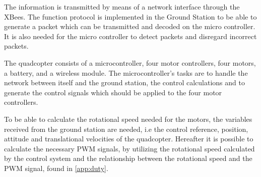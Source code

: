 The information is transmitted by means of a network interface through the XBees. The function protocol is implemented in the Ground Station to be able to generate a packet which can be transmitted and decoded on the micro controller. It is also needed for the micro controller to detect packets and disregard incorrect packets.

The quadcopter consists of a microcontroller, four motor controllers, four motors, a battery, and a wireless module. The microcontroller's tasks are to handle the network between itself and the ground station, the control calculations and to generate the control signals which should be applied to the four motor controllers.

To be able to calculate the rotational speed needed for the motors, the variables received from the ground station are needed, i.e the control reference, position, attitude and translational velocities of the quadcopter. Hereafter it is possible to calculate the necessary PWM signals, by utilizing the rotational speed calculated by the control system and the relationship between the rotational speed and the PWM signal, found in \autoref{app:duty}.







